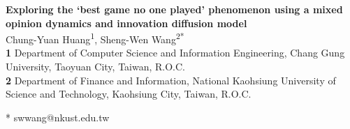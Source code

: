 \documentclass[10pt,letterpaper]{article}
\begin{document}
\vspace*{0.2in}

\begin{flushleft}
{\Large
\textbf{Exploring the `best game no one played' phenomenon using a mixed opinion dynamics and innovation diffusion model}
}
\newline
\\
Chung-Yuan Huang\textsuperscript{1},
Sheng-Wen Wang\textsuperscript{2*}
\\
\bigskip
\textbf{1} Department of Computer Science and Information Engineering, Chang Gung University, Taoyuan City, Taiwan, R.O.C.
\\
\textbf{2} Department of Finance and Information, National Kaohsiung University of Science and Technology, Kaohsiung City, Taiwan, R.O.C.
\\
\bigskip

* swwang@nkust.edu.tw

\end{flushleft}

\end{document}
